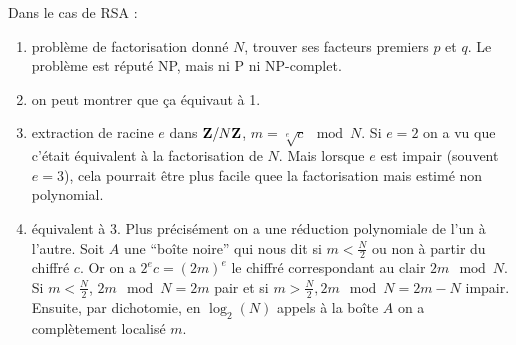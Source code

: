 \begin{ex}
		Dans le cas de RSA :
		\begin{enumerate}[1 \textrightarrow\ ]
			\item problème de factorisation donné $N$, trouver ses facteurs premiers $p$ et $q$.
				Le problème est réputé NP, mais ni P ni NP-complet.
			\item on peut montrer que ça équivaut à 1.
			\item extraction de racine $e$ dans $\mathbf{Z} / N\mathbf{Z}$, $m = \sqrt[e]{c} \mod{N}$.
				Si $e = 2$ on a vu que c'était équivalent à la factorisation de $N$.
				Mais lorsque $e$ est impair (souvent $e = 3$), cela pourrait être plus facile quee la factorisation mais estimé non polynomial.
			\item équivalent à 3.
				Plus précisément on a une réduction polynomiale de l'un à l'autre.
				Soit $A$ une “boîte noire” qui nous dit si $m < \frac{N}{2}$ ou non à partir du chiffré $c$.
				Or on a $2^e c = (2m)^e$ le chiffré correspondant au clair $2m \mod{N}$.
				Si $m < \frac{N}{2}$, $2m \mod{N} = 2m$ pair et si $m > \frac{N}{2}, 2m \mod{N} = 2m - N$ impair.
				Ensuite, par dichotomie, en $\log_2(N)$ appels à la boîte $A$ on a complètement localisé $m$.
		\end{enumerate}
	\end{ex}
	
